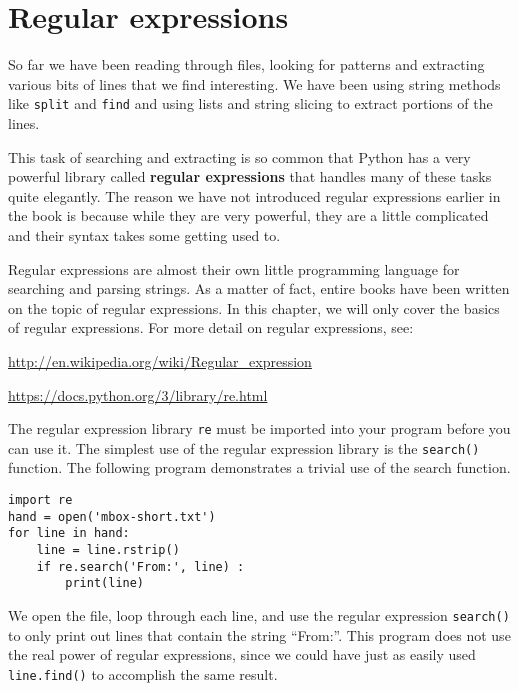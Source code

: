 
\chapter{Regular expressions}

So far we have been reading through files, looking for patterns and extracting various
bits of lines that we find interesting.  We have been using string methods like {\tt split}
and {\tt find} and using lists and string slicing to extract portions of the lines.

This task of searching and extracting is so common that Python has a very powerful library
called {\bf regular expressions} that handles many of these tasks quite elegantly.  The
reason we have not introduced regular expressions earlier in the book is because while they
are very powerful, they are a little complicated and their syntax takes some getting used to. 

Regular expressions are almost their own little programming language for searching and parsing
strings.  As a matter of fact, entire books have been written on the topic of regular expressions.
In this chapter, we will only cover the basics of regular expressions.  For more detail on regular
expressions, see:

\url{http://en.wikipedia.org/wiki/Regular_expression}

\url{https://docs.python.org/3/library/re.html}

The regular expression library {\tt re} must be imported into your program before you can use it.
The simplest use of the regular expression library is the {\tt search()} function.  The following
program demonstrates a trivial use of the search function.

\beforeverb
\begin{verbatim}
import re
hand = open('mbox-short.txt')
for line in hand:
    line = line.rstrip()
    if re.search('From:', line) :
        print(line)
\end{verbatim}
\afterverb
%
We open the file, loop through each line, and use the regular expression {\tt search()} to
only print out lines that contain the string ``From:''.   This program does not use the real
power of regular expressions, since we could have just as easily used {\tt line.find()} to
accomplish the same result.

